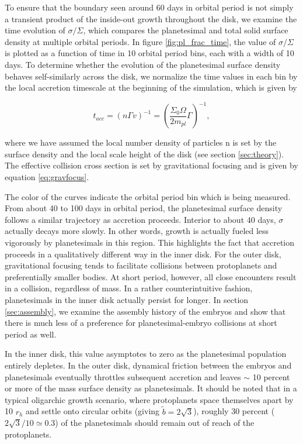 To ensure that the boundary seen around 60 days in orbital period is not
simply a transient product of the inside-out growth throughout the
disk, we examine the time evolution of $\sigma/\Sigma$, which compares the planetesimal and total solid surface density at 
multiple orbital periods. In figure \ref{fig:pl_frac_time}, the value of
$\sigma/\Sigma$ is plotted as a function of time in 10 orbital period
bins, each with a width of 10 days. To determine whether the evolution of the planetesimal surface density behaves self-similarly across the disk,
we normalize the time values in each bin by the local accretion timescale at the beginning of the simulation, which is given by

\begin{equation}\label{eq:acctime}
	t_{acc} = \left( n \Gamma v \right)^{-1} = \left( \frac{\Sigma_{0} \Omega}{2 m_{pl}} \Gamma \right)^{-1},
\end{equation}

\noindent where we have assumed the local number density of particles n is set by the surface density and the local scale height of the disk (see section \ref{sec:theory}). The effective collision cross section is set by gravitational focusing and is given by equation \ref{eq:gravfocus}.

The color of the curves indicate the orbital period bin which is being measured. From about 40 to 100 days in orbital period, the planetesimal surface 
density follows a similar trajectory as accretion proceeds. Interior to about 40 days, $\sigma$ actually decays more slowly. In other words, growth is actually 
fueled less vigorously by planetesimals in this region. This highlights the fact that accretion proceeds in a qualitatively different way in the inner disk. For the 
outer disk, gravitational focusing tends to facilitate collisions between protoplanets and preferentially smaller bodies. At short period, however, all close 
encounters result in a collision, regardless of mass. In a rather counterintuitive fashion, planetesimals in the inner disk actually persist for longer. In section 
\ref{sec:assembly}, we examine the assembly history of the embryos and show that there is much less of a preference for planetesimal-embryo collisions at 
short period as well.

In the inner disk, this value asymptotes to zero as the 
planetesimal population entirely depletes. In the outer disk, dynamical friction between the embryos and planetesimals 
eventually throttles subsequent accretion and leaves $\sim$ 10 percent or more of the mass surface density as planetesimals. It 
should be noted that in a typical oligarchic growth scenario, where protoplanets space themselves apart by 10 $r_{h}$ and settle 
onto circular orbits (giving $\tilde{b} = 2 \sqrt{3}$), roughly 30 percent ($2\sqrt{3}/10 \simeq 0.3$) of the planetesimals
should remain out of reach of the protoplanets.

